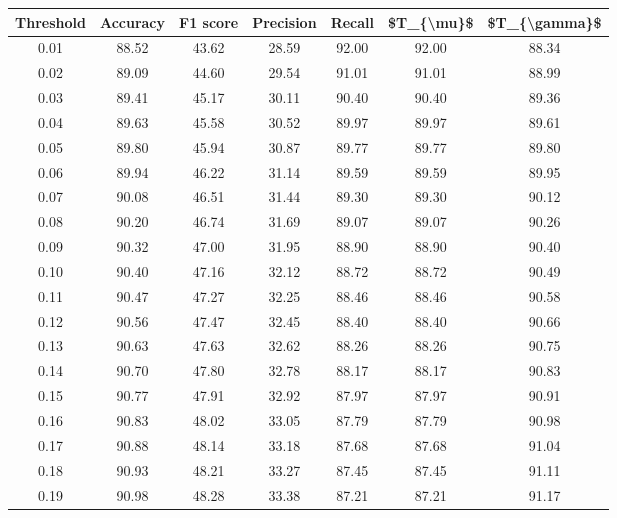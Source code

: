 \begin{tabular}{|c|c|c|c|c|c|c|}
\hline
 Threshold &  Accuracy &  F1 score &  Precision &  Recall &  \$T\_\{\textbackslash mu\}\$ &  \$T\_\{\textbackslash gamma\}\$ \\
\hline
      0.01 &     88.52 &     43.62 &      28.59 &   92.00 &      92.00 &         88.34 \\
      0.02 &     89.09 &     44.60 &      29.54 &   91.01 &      91.01 &         88.99 \\
      0.03 &     89.41 &     45.17 &      30.11 &   90.40 &      90.40 &         89.36 \\
      0.04 &     89.63 &     45.58 &      30.52 &   89.97 &      89.97 &         89.61 \\
      0.05 &     89.80 &     45.94 &      30.87 &   89.77 &      89.77 &         89.80 \\
      0.06 &     89.94 &     46.22 &      31.14 &   89.59 &      89.59 &         89.95 \\
      0.07 &     90.08 &     46.51 &      31.44 &   89.30 &      89.30 &         90.12 \\
      0.08 &     90.20 &     46.74 &      31.69 &   89.07 &      89.07 &         90.26 \\
      0.09 &     90.32 &     47.00 &      31.95 &   88.90 &      88.90 &         90.40 \\
      0.10 &     90.40 &     47.16 &      32.12 &   88.72 &      88.72 &         90.49 \\
      0.11 &     90.47 &     47.27 &      32.25 &   88.46 &      88.46 &         90.58 \\
      0.12 &     90.56 &     47.47 &      32.45 &   88.40 &      88.40 &         90.66 \\
      0.13 &     90.63 &     47.63 &      32.62 &   88.26 &      88.26 &         90.75 \\
      0.14 &     90.70 &     47.80 &      32.78 &   88.17 &      88.17 &         90.83 \\
      0.15 &     90.77 &     47.91 &      32.92 &   87.97 &      87.97 &         90.91 \\
      0.16 &     90.83 &     48.02 &      33.05 &   87.79 &      87.79 &         90.98 \\
      0.17 &     90.88 &     48.14 &      33.18 &   87.68 &      87.68 &         91.04 \\
      0.18 &     90.93 &     48.21 &      33.27 &   87.45 &      87.45 &         91.11 \\
      0.19 &     90.98 &     48.28 &      33.38 &   87.21 &      87.21 &         91.17 \\

\end{tabular}
